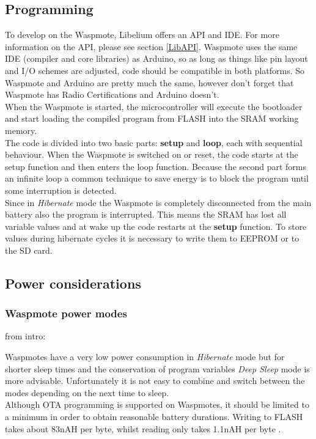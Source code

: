 \subsection{Programming}
To develop on the Waspmote, Libelium offers an API and IDE. For more information on the API, please see section \ref{LibAPI}. Waspmote uses the same IDE (compiler and core libraries) as Arduino, so as long as things like pin layout and I/O schemes are adjusted, code should be compatible in both platforms. So Waspmote and Arduino are pretty much the same, however don't forget that Waspmote has Radio Certifications and Arduino doesn't.\\  
When the Waspmote is started, the microcontroller will execute the bootloader and start loading the compiled program from FLASH into the SRAM working memory.\\
The code is divided into two basic parts: \textbf{setup} and \textbf{loop}, each with sequential behaviour. When the Waspmote is switched on or reset, the code starts at the setup function and then enters the loop function. Because the second part forms an infinite loop a common technique to save energy is to block the program until some interruption is detected.\\
Since in \textit{Hibernate} mode the Waspmote is completely disconnected from the main battery also the program is interrupted. This means the SRAM has lost all variable values and at wake up the code restarts at the \textbf{setup} function. To store values during hibernate cycles it is necessary to write them to EEPROM or to the SD card.
\subsection{Power considerations}
\label{pow}
\subsubsection{Waspmote power modes}
\label{dynPow}

from intro:

Waspmotes have a very low power consumption in \textit{Hibernate} mode but for shorter sleep times and the conservation of program variables \textit{Deep Sleep} mode is more advisable. Unfortunately it is not easy to combine and switch between the modes depending on the next time to sleep.\\
Although OTA programming is supported on Waspmotes, it should be limited to a minimum in order to obtain reasonable battery durations. Writing to FLASH takes about 83nAH per byte, whilst reading only takes 1.1nAH per byte \citep{KTH}. 


